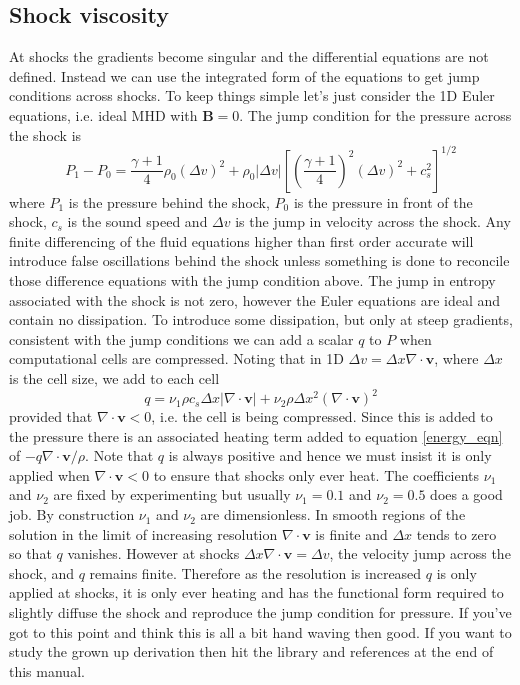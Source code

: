 \documentclass[11pt]{article}
\begin{document}
\subsection{Shock viscosity}
At shocks the gradients become singular and the differential equations are not defined. Instead we can use the integrated form of the equations to get jump conditions across shocks. To keep things simple let's just consider the 1D Euler equations, i.e. ideal MHD with $\mathbf{B}=0$. The jump condition for the pressure across the shock is
\begin{equation}
P_1-P_0=\frac{\gamma+1}{4}\rho_0(\Delta v)^2 + \rho_0 |\Delta v|\left[\left(\frac{\gamma+1}{4}\right)^2(\Delta v)^2 + c_s^2\right]^{1/2}\label{jump}
\end{equation}
where $P_1$ is the pressure behind the shock, $P_0$ is the pressure in front of the shock, $c_s$ is the sound speed and $\Delta v$ is the jump in velocity across the shock. Any finite differencing of the fluid equations higher than first order accurate will introduce false oscillations behind the shock unless something is done to reconcile those difference equations with the jump condition above. The jump in entropy associated with the shock is not zero, however the Euler equations are ideal and contain no dissipation. To introduce some dissipation, but only at steep gradients, consistent with the jump conditions we can add a scalar $q$ to $P$ when computational cells are compressed. Noting that in 1D $\Delta v=\Delta x \nabla\cdot\mathbf{v}$, where $\Delta x$ is the cell size, we add to each cell
\begin{displaymath}
q = \nu_1 \rho c_s \Delta x |\nabla\cdot\mathbf{v}| + \nu_2 \rho \Delta x^2 (\nabla\cdot\mathbf{v})^2
\end{displaymath}
provided that $\nabla\cdot\mathbf{v}<0$, i.e. the cell is being compressed. Since this is added to the pressure there is an associated heating term added to equation \ref{energy_eqn} of $-q \nabla\cdot\mathbf{v}/\rho$. Note that $q$ is always positive and hence we must insist it is only applied when $\nabla\cdot\mathbf{v}<0$ to ensure that shocks only ever heat. The coefficients $\nu_1$ and $\nu_2$ are fixed by experimenting but usually $\nu_1=0.1$ and $\nu_2=0.5$ does a good job. By construction $\nu_1$ and $\nu_2$ are dimensionless. In smooth regions of the solution in the limit of increasing resolution $\nabla\cdot\mathbf{v}$ is finite and $\Delta x$ tends to zero so that $q$ vanishes. However at shocks $\Delta x \nabla\cdot\mathbf{v}=\Delta v$, the velocity jump across the shock, and $q$ remains finite. Therefore as the resolution is increased $q$ is only applied at shocks, it is only ever heating and has the functional form required to slightly diffuse the shock and reproduce the jump condition for pressure. If you've got to this point and think this is all a bit hand waving then good. If you want to study the grown up derivation then hit the library and references at the end of this manual.
\end{document}
